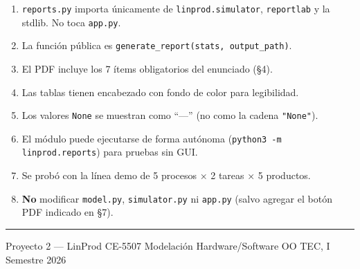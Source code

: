\documentclass[12pt,letterpaper]{article}
\newcommand{\cmark}{\textcolor{accentgreen}{\ding{51}}}
\newcommand{\xmark}{\textcolor{accentred}{\ding{55}}}
\begin{document}
\begin{enumerate}[leftmargin=2em]
  \item[\cmark] \texttt{reports.py} importa únicamente de \texttt{linprod.simulator},
    \texttt{reportlab} y la stdlib. No toca \texttt{app.py}.
  \item[\cmark] La función pública es \texttt{generate\_report(stats, output\_path)}.
  \item[\cmark] El PDF incluye los 7 ítems obligatorios del enunciado (\S4).
  \item[\cmark] Las tablas tienen encabezado con fondo de color para legibilidad.
  \item[\cmark] Los valores \texttt{None} se muestran como ``—'' (no como la cadena
    \texttt{"None"}).
  \item[\cmark] El módulo puede ejecutarse de forma autónoma (\texttt{python3 -m linprod.reports})
    para pruebas sin GUI.
  \item[\cmark] Se probó con la línea demo de 5 procesos × 2 tareas × 5 productos.
  \item[\xmark] \textbf{No} modificar \texttt{model.py}, \texttt{simulator.py} ni
    \texttt{app.py} (salvo agregar el botón PDF indicado en \S7).
\end{enumerate}

\vspace{1em}
\hrule
\vspace{0.5em}
\begin{center}
  \small
  Proyecto 2 — LinProd \textbullet{}
  CE-5507 Modelación Hardware/Software OO \textbullet{}
  TEC, I Semestre 2026
\end{center}
\end{document}

